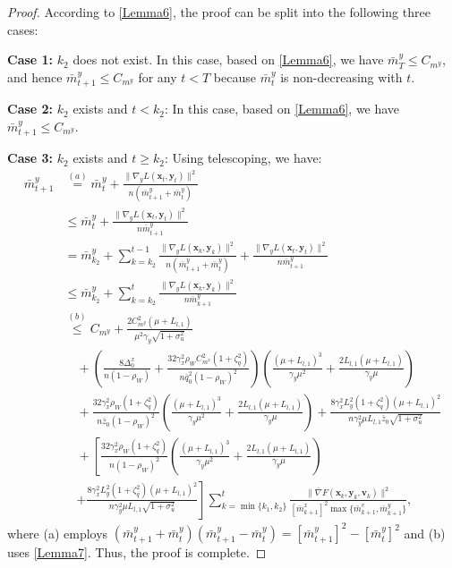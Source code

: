 \documentclass{article}
\theoremstyle{plain}
\theoremstyle{definition}
\theoremstyle{remark}
\begin{document}
\begin{proof}
According to \cref{Lemma6}, the proof can be split into the following three cases:

\textbf{Case 1:} $k_2$ does not exist. In this case, based on \cref{Lemma6}, we have $\bar{m}^y_T \leq C_{m^y}$, and hence $\bar{m}^y_{t+1} \leq C_{m^y}$ for any $t < T$ because $\bar{m}^y_t$ is non-decreasing with $t$.

\textbf{Case 2:} $k_2$ exists and $t < k_2$: In this case, based on \cref{Lemma6}, we have $\bar{m}^y_{t+1} \leq C_{m^y}$.

\textbf{Case 3:} $k_2$ exists and $t \geq k_2$: Using telescoping, we have:
\begin{align}
\bar{m}^y_{t+1} &\overset{(a)}{=} \bar{m}^y_t + \frac{\|\nabla_y L(\mathbf{x}_t, \mathbf{y}_t)\|^2}{n(\bar{m}^y_{t+1} + \bar{m}^y_t)}\nonumber \\
&\leq \bar{m}^y_t + \frac{\|\nabla_y L(\mathbf{x}_t, \mathbf{y}_t)\|^2}{n\bar{m}^y_{t+1}} \nonumber\\
&= \bar{m}^y_{k_2} + \sum_{k=k_2}^{t-1}  \frac{\|\nabla_y L(\mathbf{x}_k, \mathbf{y}_k)\|^2}{n(\bar{m}^y_{t+1} + \bar{m}^y_t)}+\frac{\|\nabla_y L(\mathbf{x}_t, \mathbf{y}_t)\|^2}{n\bar{m}^y_{t+1}} \nonumber\\
&\leq \bar{m}^y_{k_2} + \sum_{k=k_2}^t  \frac{\|\nabla_y L(\mathbf{x}_k, \mathbf{y}_k)\|^2}{n\bar{m}^y_{k+1}} \nonumber \\
&\overset{(b)}{\leq} C_{m^y}+\frac{ 2C_{m^y}^2(\mu + L_{l,1})}{\mu^2\gamma_y\sqrt{1+\sigma_u^2}} \nonumber\\
&\quad+\left(\frac{8\Delta_0^x}{n(1-\rho_W)}+\frac{32 \gamma_x^2 \rho_WC_{m^x}^2 (1 + \zeta_q^2)}{n\bar{q}_0^2(1 - \rho_W)^2} \right)\left(\frac{(\mu+L_{l,1})^3}{\gamma_y\mu^2}+\frac{2L_{l,1}(\mu+L_{l,1})}{\gamma_y\mu}\right)\nonumber\\
&\quad+ \frac{32 \gamma_x^2 \rho_W(1 + \zeta_q^2)}{n\bar{z}_0(1 - \rho_W)^2} \left(\frac{(\mu+L_{l,1})^3}{\gamma_y\mu^2}+\frac{2L_{l,1}(\mu+L_{l,1})}{\gamma_y\mu}\right)+\frac{8\gamma_x^2  L_y^2\left( 1 + \zeta_q^2 \right) (\mu + L_{l,1})^2}{n\gamma_y^2\mu L_{l,1}\bar{z}_0\sqrt{1+\sigma_u^2}} \nonumber\\
&\quad+ \left[\frac{32 \gamma_x^2 \rho_W(1 + \zeta_q^2)}{n(1 - \rho_W)^2} \left(\frac{(\mu+L_{l,1})^3}{\gamma_y\mu^2}+\frac{2L_{l,1}(\mu+L_{l,1})}{\gamma_y\mu}\right)\right.\nonumber\\
&\quad\left.+\frac{8\gamma_x^2  L_y^2\left( 1 + \zeta_q^2 \right) (\mu + L_{l,1})^2}{n\gamma_y^2\mu L_{l,1}\sqrt{1+\sigma_u^2}}\right]\!\! \sum_{k=\min\{k_1,k_2\}}^t \frac{\|\bar{\nabla} F(\mathbf{x}_k,\mathbf{y}_k,\mathbf{v}_k)\|^2}{[\bar{m}^x_{k+1}]^2\max \big\{\bar{m}^v_{k+1}, \bar{m}^y_{k+1}\big\}},\label{eq82}
\end{align}
where (a) employs $(\bar{m}^y_{t+1}+\bar{m}^y_{t})(\bar{m}^y_{t+1}-\bar{m}^y_{t})=[\bar{m}^y_{t+1}]^2-[\bar{m}^y_{t}]^2$ and (b) uses \cref{Lemma7}. Thus, the proof is complete. 
\end{proof}
\end{document}

